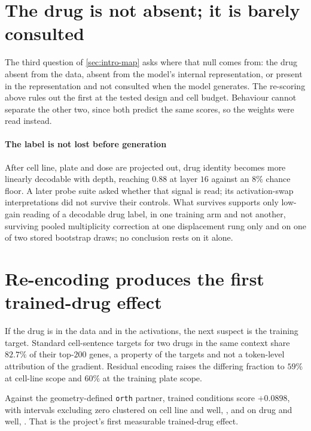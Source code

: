 \section{The drug is not absent; it is barely consulted}

The third question of \cref{sec:intro-map} asks where that null comes from: the
drug absent from the data, absent from the model's internal representation, or
present in the representation and not consulted when the model generates. The
re-scoring above rules out the first at the tested design and cell budget.
Behaviour cannot separate the other two, since both predict the same scores, so
the weights were read instead.

\paragraph{The label is not lost before generation} After cell line, plate and
dose are projected out, drug identity becomes more linearly decodable with depth,
reaching $0.88$ at layer $16$ against an $8\%$ chance floor. A later probe suite
asked whether that signal is read; its activation-swap interpretations did not
survive their controls. What survives supports only low-gain reading of a
decodable drug label, in one training arm and not another, surviving pooled
multiplicity correction at one displacement rung only and on one of two stored
bootstrap draws; no conclusion rests on it alone.

\section{Re-encoding produces the first trained-drug effect}

If the drug is in the data and in the activations, the next suspect is the
training target. Standard cell-sentence targets for two drugs in the same context
share $82.7\%$ of their top-$200$ genes, a property of the targets and not a
token-level attribution of the gradient. Residual encoding raises the differing
fraction to $59\%$ at cell-line scope and $60\%$ at the training plate scope.

Against the geometry-defined \texttt{orth} partner, trained conditions score
$+0.0898$, with intervals excluding zero clustered on cell line and well,
, and on drug and well,
. That is the project's first measurable
trained-drug effect.

